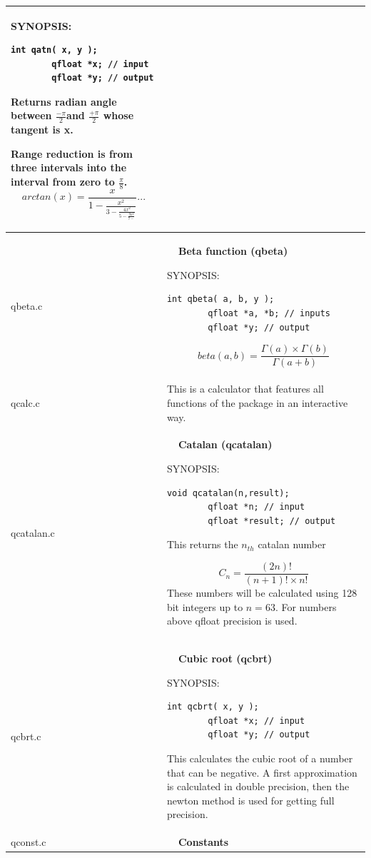 \documentclass[10pt,a4paper,x11names]{memoir} %
\newcounter{entry}
\newcommand{\TOC}[1] {\addcontentsline{toc}{section}{\theentry\ \  #1} \textbf{\theentry\ \  #1} \par\stepcounter{entry}}
\begin{document}
\begin{longtable}{|p{1.5cm}|p{11.5cm}|}
	{\footnotesize SYNOPSIS:}\vspace{-0.2cm}\index{qatn}
	\begin{lstlisting}[numbers=none]
		int qatn( x, y );
		qfloat *x; // input
		qfloat *y; // output
	\end{lstlisting}\vspace{-0.2cm}
	Returns radian angle between $\frac{-\pi}{2}$and $\frac{+\pi}{2}$ whose tangent is x.
	
	Range reduction is from three intervals into the interval from zero to $\frac{\pi}{8}$.
	$$arctan(x)=\frac{x}{1 - \frac{x^2}{3 - \frac{4x^2}{5 - \frac{9x^2}{7-}}}} ... $$
	
	\\\hline
	qbeta.c &\TOC{Beta function (qbeta)}
	{\footnotesize SYNOPSIS:}\vspace{-0.2cm}\index{qbeta}
	\begin{lstlisting}[numbers=none]
		int qbeta( a, b, y );
		qfloat *a, *b; // inputs
		qfloat *y; // output
	\end{lstlisting}\vspace{-0.2cm}
	
	$$ beta(a,b) = \frac{\Gamma (a) \times \Gamma (b)}{\Gamma (a+b)}$$
	\\\hline
	qcalc.c& \index{qcalc }This is a calculator that features all functions of the package in an interactive way.\\\hline
	qcatalan.c& \TOC{Catalan (qcatalan)}
	{\footnotesize SYNOPSIS:}\vspace{-0.2cm}\index{qcatalan}
	\begin{lstlisting}[numbers=none]
		void qcatalan(n,result);
		qfloat *n; // input
		qfloat *result; // output
	\end{lstlisting}\vspace{-0.2cm}
	This returns the $n_{th}$ catalan number
	
	$$C_n=\frac{(2n)!}{(n+1)!\times n!}$$ These  numbers will be calculated using 128 bit integers up to $n=63$. For numbers above qfloat precision is used.
	\\\hline
	qcbrt.c& \TOC{Cubic root (qcbrt)}
	{\footnotesize SYNOPSIS:}\vspace{-0.2cm}\index{qcbrt}
	\begin{lstlisting}[numbers=none]
		int qcbrt( x, y );
		qfloat *x; // input
		qfloat *y; // output
	\end{lstlisting}\vspace{-0.2cm}
	This calculates the cubic root of a number that can be negative. A first approximation is calculated in double precision, then  the newton method is used for getting full precision.
	\\\hline 
	qconst.c& \TOC{Constants}
	

\end{longtable}
\end{document}
